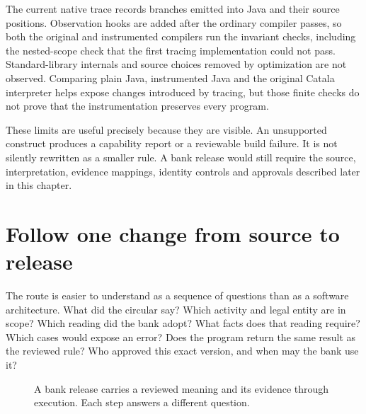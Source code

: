 The current native trace records branches emitted into Java and their source
positions. Observation hooks are added after the ordinary compiler passes, so
both the original and instrumented compilers run the invariant checks, including
the nested-scope check that the first tracing implementation could not pass.
Standard-library internals and source choices removed by optimization are not
observed. Comparing plain Java, instrumented Java and the original Catala
interpreter helps expose changes introduced by tracing, but those finite checks
do not prove that the instrumentation preserves every program.

These limits are useful precisely because they are visible. An unsupported
construct produces a capability report or a reviewable build failure. It is not
silently rewritten as a smaller rule. A bank release would still require the
source, interpretation, evidence mappings, identity controls and approvals
described later in this chapter.



\section{Follow one change from source to release}

The route is easier to understand as a sequence of questions than as a software
architecture. What did the circular say? Which activity and legal entity are in
scope? Which reading did the bank adopt? What facts does that reading require?
Which cases would expose an error? Does the program return the same result as the
reviewed rule? Who approved this exact version, and when may the bank use it?

\begin{figure}[htbp]
\centering
{}
\caption{A bank release carries a reviewed meaning and its evidence through
execution. Each step answers a different question.}
\label{fig:reader-implementation-route}
\end{figure}

